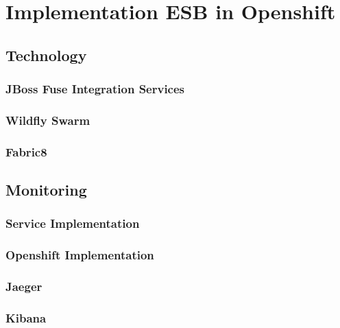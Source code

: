 \chapter{Implementation ESB in Openshift}
\label{cha:esbi}

\section{Technology}
\label{sec:esbi-technolody-fis}

\subsection{JBoss Fuse Integration Services}
\label{sec:esbi-technology-fis}

\subsection{Wildfly Swarm}
\label{sec:esbi-technology-swarm}

\subsection{Fabric8}
\label{sec:esbi-technology-f8}

\section{Monitoring}
\label{sec:esbi-monitoring}

\subsection{Service Implementation}
\label{sec:esbi-minitoring-service}

\subsection{Openshift Implementation}
\label{sec:esbi-minitoring-openshift}

\subsection{Jaeger}
\label{sec:esbi-minitoring-jaeger}

\newpage
\subsection{Kibana}
\label{sec:esbi-minitoring-kibana}

